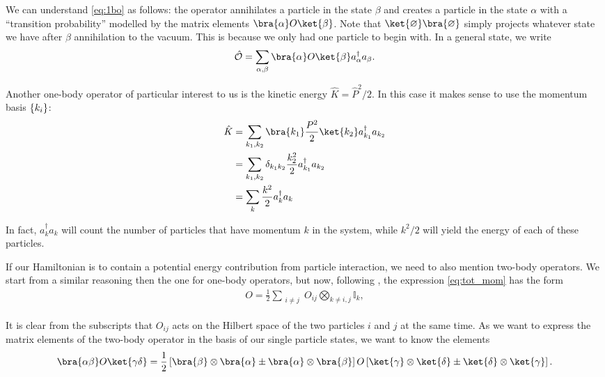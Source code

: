 We can understand \eqref{eq:1bo} as follows: the operator annihilates a particle in the state $\beta$ and creates a particle in the state $\alpha$ with a ``transition probability'' modelled by the matrix elements $\bra{\alpha} O\ket{\beta}$. Note that $\ket{\varnothing}\bra{\varnothing}$ simply projects whatever state we have after $\beta$ annihilation to the vacuum. This is because we only had one particle to begin with. In a general state, we write
\begin{align*}
    \op{O} =\sum_{\alpha,\beta} \bra{\alpha} O\ket{\beta}a_\alpha^\dagger a_{\beta}.
\end{align*}

Another one-body operator of particular interest to us is the kinetic energy $\hat{K} = \hat{P}^2/2$. In this case it makes sense to use the momentum basis $\{k_i\}$:
\begin{align*}
    \hat{K} &= \sum_{k_1, k_2} \bra{k_1} \frac{P^2}{2}\ket{k_2} a_{k_1}^\dagger a_{k_2} \\
        &= \sum_{k_1, k_2} \delta_{k_1k_2} \frac{k_2^2}{2} a_{k_1}^\dagger a_{k_2} \\
        &= \sum_{k} \frac{k^2}{2} a_{k}^\dagger a_{k} 
\end{align*}

In fact, $a_{k}^\dagger a_{k}$ will count the number of particles that have momentum $k$ in the system, while $k^2/2$ will yield the energy of each of these particles.

If our Hamiltonian is to contain a potential energy contribution from particle interaction, we need to also mention two-body operators. We start from a similar reasoning then the one for one-body operators, but now, following \cite{giamarchi2008manybody}, the expression \eqref{eq:tot_mom} has the form 
\begin{align}
O =\frac{1}{2}\sum_{\substack{ i\neq j}} O_{ij}\bigotimes_{k \neq i, j} \mathbb{I}_k,   \label{eq:twobody_op}
\end{align}

It is clear from the subscripts that $O_{ij}$ acts on the Hilbert space of the two particles $i$ and $j$ at the same time. As we want to express the matrix elements of the two-body operator in the basis of our single particle states, we want to know the elements 
\begin{align*}
    \bra{\alpha \beta}O\ket{\gamma\delta} =\frac{1}{2}\left[ \bra{\beta}\otimes \bra{\alpha} \pm \bra{\alpha}\otimes \bra{\beta}\right]O \left[\ket{\gamma}\otimes \ket{\delta} \pm \ket{\delta}\otimes \ket{\gamma}\right].
\end{align*}

